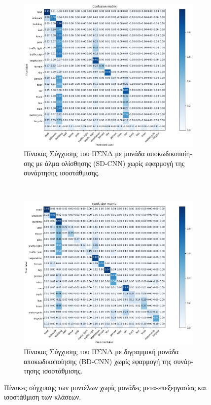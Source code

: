 \newpage
\begin{figure}[H]
\centering
\begin{subfigure}[b]{\linewidth}
 \includegraphics[scale=0.38 ]{Images/final_CF_5}
 \caption{\textgreek{Πίνακας Σύγχυσης του ΠΣΝΔ με μονάδα αποκωδικοποίησης με άλμα ολίσθησης} (SD-CNN)\textgreek{ χωρίς εφαρμογή της συνάρτησης ισοστάθμισης.}}
\end{subfigure}
\\[1pt]
\begin{subfigure}[b]{\linewidth}
 \includegraphics[scale=0.38]{Images/final_CF_11}
 \caption{\textgreek{Πίνακας Σύγχυσης του ΠΣΝΔ με διγραμμική μονάδα αποκωδικοποίησης} (BD-CNN)\textgreek{ χωρίς εφαρμογή της συνάρτησης ισοστάθμισης.}}
 \end{subfigure}
 
\caption[\textgreek{Πίνακες Σύγχυσης χωρίς μετα-επεξεργασία}]{\textgreek{Πίνακες σύγχυσης των μοντέλων χωρίς μονάδες μετα-επεξεργασίας και ισοστάθμιση των κλάσεων.}}
\label{fig:cf_1}
\end{figure}



